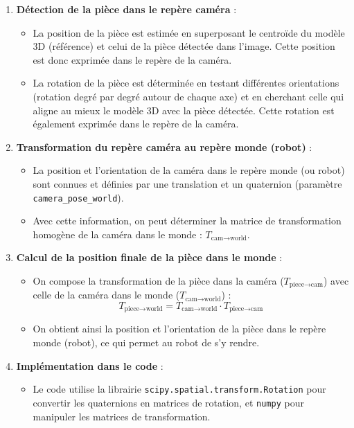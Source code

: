 \begin{enumerate}
    \item \textbf{Détection de la pièce dans le repère caméra} :
          \begin{itemize}
              \item La position de la pièce est estimée en superposant le centroïde du modèle 3D (référence) et celui de la pièce détectée dans l'image. Cette position est donc exprimée dans le repère de la caméra.
              \item La rotation de la pièce est déterminée en testant différentes orientations (rotation degré par degré autour de chaque axe) et en cherchant celle qui aligne au mieux le modèle 3D avec la pièce détectée. Cette rotation est également exprimée dans le repère de la caméra.
          \end{itemize}
    \item \textbf{Transformation du repère caméra au repère monde (robot)} :
          \begin{itemize}
              \item La position et l'orientation de la caméra dans le repère monde (ou robot) sont connues et définies par une translation et un quaternion (paramètre \texttt{camera\_pose\_world}).
              \item Avec cette information, on peut déterminer la matrice de transformation homogène de la caméra dans le monde : $T_{\text{cam} \to \text{world}}$.
          \end{itemize}
    \item \textbf{Calcul de la position finale de la pièce dans le monde} :
          \begin{itemize}
              \item On compose la transformation de la pièce dans la caméra ($T_{\text{piece} \to \text{cam}}$) avec celle de la caméra dans le monde ($T_{\text{cam} \to \text{world}}$) :
                    \[
                        T_{\text{piece} \to \text{world}} = T_{\text{cam} \to \text{world}} \cdot T_{\text{piece} \to \text{cam}}
                    \]
              \item On obtient ainsi la position et l'orientation de la pièce dans le repère monde (robot), ce qui permet au robot de s'y rendre.
          \end{itemize}
    \item \textbf{Implémentation dans le code} :
          \begin{itemize}
              \item Le code utilise la librairie \texttt{scipy.spatial.transform.Rotation} pour convertir les quaternions en matrices de rotation, et \texttt{numpy} pour manipuler les matrices de transformation.
          \end{itemize}
\end{enumerate}



